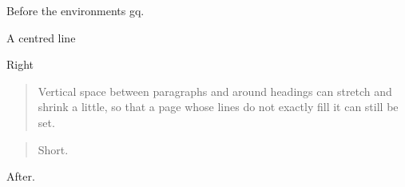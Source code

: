 \documentclass{article}
\begin{document}
Before the environments gq.
\begin{center}
A centred line
\end{center}
\begin{flushright}
Right
\end{flushright}
\begin{quotation}
Vertical space between paragraphs and around headings can stretch and shrink a little, so that a page whose lines do not exactly fill it can still be set.
\end{quotation}
\begin{quote}
Short.
\end{quote}
After.
\end{document}
